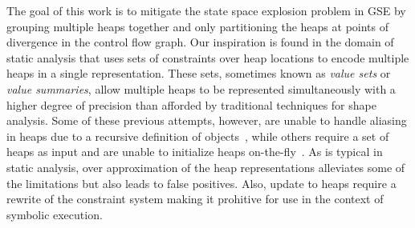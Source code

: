 
The goal of this work is to mitigate the state space explosion problem
in GSE by grouping multiple heaps together and only partitioning the
heaps at points of divergence in the control flow graph. Our
inspiration is found in the domain of static analysis that uses sets
of constraints over heap locations to encode multiple heaps in a
single representation. These sets, sometimes known as \emph{value
  sets} or \emph{value summaries}, allow multiple heaps to be
represented simultaneously with a higher degree of precision than
afforded by traditional techniques for shape analysis. Some of these
previous attempts, however, are unable to handle aliasing in heaps due
to a recursive definition of objects~\cite{..}, while others require a
set of heaps as input and are unable to initialize heaps
on-the-fly~\cite{..}.  As is typical in static analysis, over
approximation of the heap representations alleviates some of the
limitations but also leads to false positives. Also, update to heaps
require a rewrite of the constraint system making it prohitive for use
in the context of symbolic execution.

\begin{comment}
Unfortunately, value sets often do not support aliasing and require a
recursive definition of objects~\cite{..}. Also, heap updates often
require that the path constraint be rewritten to reflect the update,
and the constraints in the value set may also need to be rewritten with the
addition of auxiliary variables. These non-local operations make it
difficult to use value sets in symbolic execution. As is
typical in static analysis, over approximation of the value sets
alleviates some of the limitations but also leads to false positives.
\end{comment}




